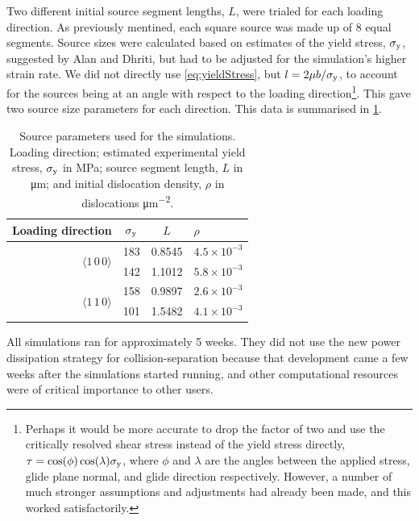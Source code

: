 Two different initial source segment lengths, $L$, were trialed for each loading direction. As previously mentined, each square source was made up of 8 equal segments. Source sizes were calculated based on estimates of the yield stress, $\sigma_{\textrm{y}}$, suggested by Alan and Dhriti, but had to be adjusted for the simulation's higher strain rate. We did not directly use \cref{eq:yieldStress}, but $l = 2 \mu b / \sigma_{\textrm{y}}$, to account for the sources being at an angle with respect to the loading direction\footnote{Perhaps it would be more accurate to drop the factor of two and use the critically resolved shear stress instead of the yield stress directly, $\tau = \cos(\phi)\cos(\lambda) \sigma_{\textrm{y}}$, where $\phi$ and $\lambda$ are the angles between the applied stress, glide plane normal, and glide direction respectively. However, a number of much stronger assumptions and adjustments had already been made, and this worked satisfactorily.}. This gave two source size parameters for each direction. This data is summarised in \cref{t:sourceSize}.
\begin{table}
    \centering
    \caption{Source parameters used for the simulations. Loading direction; estimated experimental yield stress, $\sigma_{\textrm{y}}$ in \si{\mega\pascal}; source segment length, $L$ in \si{\micro\metre}; and initial dislocation density, $\rho$ in dislocations \si{\micro\metre^{-2}}.}
    \label{t:sourceSize}
    \begin{tabular}{rccl}
        \toprule
        Loading direction                            & $\sigma_{\textrm{y}}$ & $L$    & $\rho$              \\
        \midrule
        \multirow{2}{*}{$\langle 1\, 0\, 0 \rangle$} & 183               & 0.8545 & $4.5\times 10^{-3}$ \\
                                                     & 142               & 1.1012 & $5.8\times 10^{-3}$ \\
        \midrule
        \multirow{2}{*}{$\langle 1\, 1\, 0 \rangle$} & 158               & 0.9897 & $2.6\times 10^{-3}$ \\
                                                     & 101               & 1.5482 & $4.1\times 10^{-3}$ \\
        \bottomrule
    \end{tabular}
\end{table}

All simulations ran for approximately 5 weeks. They did not use the new power dissipation strategy for collision-separation because that development came a few weeks after the simulations started running, and other computational resources were of critical importance to other users.

